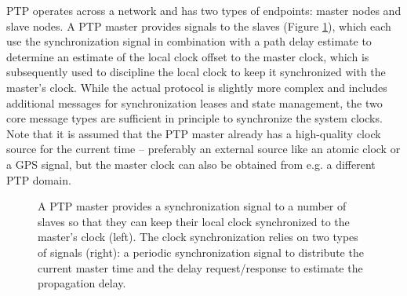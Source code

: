 PTP operates across a network and has two types of endpoints: master nodes and slave nodes. A PTP master provides signals to the slaves (Figure \ref{fig:ptp-architecture}), which each use the synchronization signal in combination with a path delay estimate to determine an estimate of the local clock offset to the master clock, which is subsequently used to discipline the local clock to keep it synchronized with the master's clock. While the actual protocol is slightly more complex and includes additional messages for synchronization leases and state management, the two core message types are sufficient in principle to synchronize the system clocks. Note that it is assumed that the PTP master already has a high-quality clock source for the current time -- preferably an external source like an atomic clock or a GPS signal, but the master clock can also be obtained from e.g. a different PTP domain.

\begin{figure}
    \caption{
        A PTP master provides a synchronization signal to a number of slaves so that they can keep their local clock synchronized to the master's clock (left). The clock synchronization relies on two types of signals (right): a periodic synchronization signal to distribute the current master time and the delay request/response to estimate the propagation delay.
    }
    \label{fig:ptp-architecture}
\end{figure}

